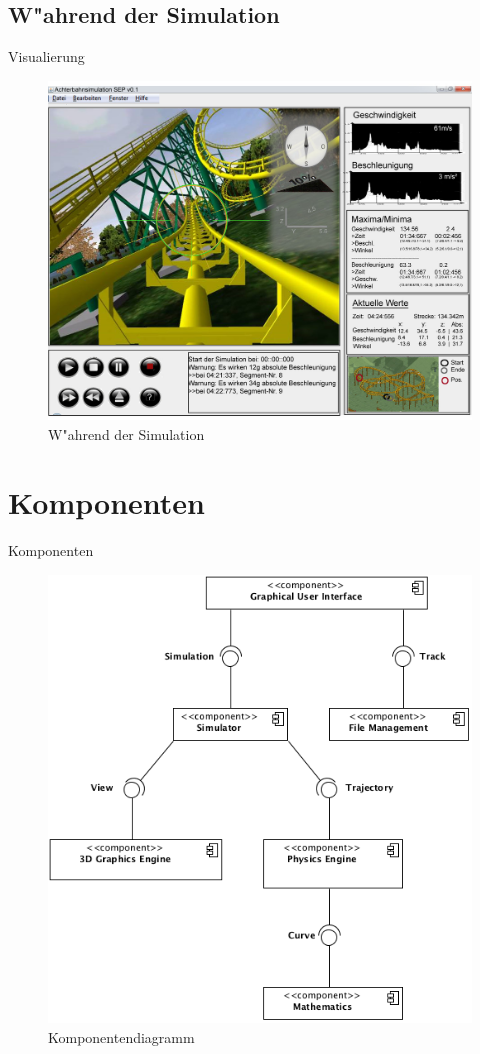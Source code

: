 \documentclass{beamer}%
\begin{document}
	\subsection{W"ahrend der Simulation}
		\begin{frame}{Visualierung}
		\begin{figure}
			\includegraphics[width=0.75\linewidth]{GUI_v2.jpg}
			\caption{W"ahrend der Simulation}
		\end{figure}
	\end{frame}
	
	\section{Komponenten}
	\begin{frame}{Komponenten}
		\begin{figure}
			\includegraphics[width=0.55\linewidth]{component_overview.png}
			\caption{Komponentendiagramm}
		\end{figure}
	\end{frame}
	
	
\end{document}

